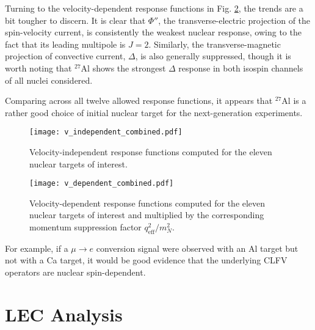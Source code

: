 \documentclass{book}[12pt]
\begin{document}
Turning to the velocity-dependent response functions in Fig. \ref{fig:v_dep_responses}, the trends are a bit tougher to discern. It is clear that $\Phi''$, the transverse-electric projection of the spin-velocity current, is consistently the weakest nuclear response, owing to the fact that its leading multipole is $J=2$. Similarly, the transverse-magnetic projection of convective current, $\Delta$, is also generally suppressed, though it is worth noting that $^{27}$Al shows the strongest $\Delta$ response in both isospin channels of all nuclei considered. 

Comparing across all twelve allowed response functions, it appears that $^{27}$Al is a rather good choice of initial nuclear target for the next-generation experiments.
\begin{figure}
\centering
\texttt{[image: v\_independent\_combined.pdf]}
\caption{Velocity-independent response functions computed for the eleven nuclear targets of interest.}
\label{fig:v_ind_responses}
\end{figure}
\begin{figure}
\centering
\texttt{[image: v\_dependent\_combined.pdf]}
\caption{Velocity-dependent response functions computed for the eleven nuclear targets of interest and multiplied by the corresponding momentum suppression factor $q_\mathrm{eff}^2/m_N^2$.}
\label{fig:v_dep_responses}
\end{figure}
For example, if a $\mu\rightarrow e$ conversion signal were observed with an Al target but not with a Ca target, it would be good evidence that the underlying CLFV operators are nuclear spin-dependent.
\chapter{LEC Analysis}
\end{document}
